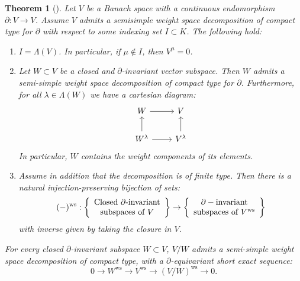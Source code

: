 \documentclass{amsart}
\newtheorem{teo}[defi]{ Theorem}
\begin{document}
\begin{teo}[{\cite{diagonFrechet modules}}]\label{teo weight space decomposition ss case}
Let $V$ be a Banach space with a continuous endomorphism $\partial: V\rightarrow V$. Assume $V$ admits a semisimple weight space decomposition of compact type for $\partial$ with respect to some indexing set $I\subset K$. The following hold: 
\begin{enumerate}[label=(\roman*)]
    \item $I=\Lambda(V)$. In particular, if $\mu \not\in I$, then $V^{\mu}=0$.
    \item Let $W\subset V$ be a closed and $\partial$-invariant vector subspace. Then $W$ admits a semi-simple weight space decomposition of compact type for $\partial$. Furthermore, for all $\lambda \in \Lambda(W)$ we have a cartesian diagram:
    \begin{equation*}
\begin{tikzcd}
W \arrow[r]                     & V                     \\
W^{\lambda} \arrow[r] \arrow[u] & V^{\lambda} \arrow[u]
\end{tikzcd}
    \end{equation*}
    In particular, $W$ contains the weight components of its elements.
    \item Assume in addition that the decomposition is of finite type.  Then there is a natural injection-preserving bijection of sets:
    \begin{equation*}
      (-)^{\operatorname{ws}}: \left\{ 
				\begin{array}{c} 
					\textnormal{Closed }\partial \textnormal{-invariant}\\ 
					\textnormal{subspaces of } V				\end{array}
\right\}
\rightarrow 
\left\{ 
				\begin{array}{c} 
                \partial-
				\textnormal{invariant}\\ 
					\textnormal{subspaces of } V^{\operatorname{ws}}				\end{array}
\right\}
    \end{equation*}
with inverse given by taking the closure in $V$.
\end{enumerate}
For every closed $\partial$-invariant subspace $W\subset V$, $V/W$ admits a semi-simple weight space decomposition of compact type, with a $\partial$-equivariant short exact sequence:
\begin{equation*}
    0\rightarrow W^{\operatorname{ws}}\rightarrow V^{\operatorname{ws}}\rightarrow (V/W)^{\operatorname{ws}}\rightarrow 0.
\end{equation*}
\end{teo}
\end{document}
